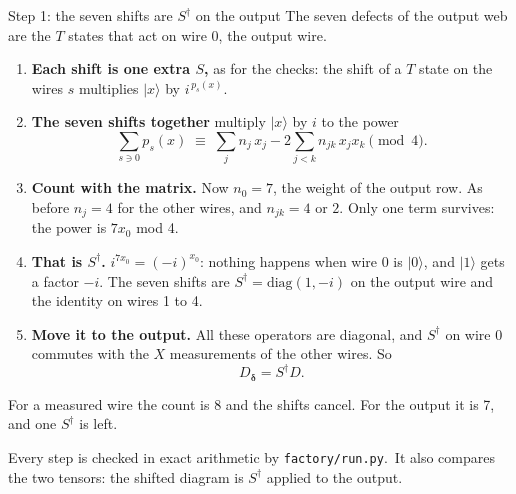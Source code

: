 \documentclass[aspectratio=169,10pt]{beamer}
\newcommand{\ket}[1]{\lvert#1\rangle}
\newcommand{\source}[1]{\par\vfill{\fontsize{6}{7}\selectfont\color{black!70}#1\par}}
\newcommand{\checkedref}{Every step is checked in exact arithmetic by \texttt{factory/run.py}.}
\begin{document}
\begin{frame}{Step 1: the seven shifts are $S^\dagger$ on the output}
\small
The seven defects of the output web are the $T$ states that act on wire 0, the output wire.
\begin{enumerate}
\item \textbf{Each shift is one extra $S$,} as for the checks: the shift of a $T$ state on the wires $s$ multiplies $\ket{x}$ by $i^{\,p_s(x)}$.
\item \textbf{The seven shifts together} multiply $\ket{x}$ by $i$ to the power
\[
 \textstyle\sum_{s\ni 0}p_s(x)\;\equiv\;\sum_j n_j\,x_j-2\sum_{j<k}n_{jk}\,x_jx_k \pmod 4 .
\]
\item \textbf{Count with the matrix.} Now $n_0=7$, the weight of the output row. As before $n_j=4$ for the other wires, and $n_{jk}=4$ or $2$. Only one term survives: the power is $7x_0$ mod 4.
\item \textbf{That is $S^\dagger$.} $i^{7x_0}=(-i)^{x_0}$: nothing happens when wire 0 is $\ket0$, and $\ket1$ gets a factor $-i$. The seven shifts are $S^\dagger=\mathrm{diag}(1,-i)$ on the output wire and the identity on wires 1 to 4.
\item \textbf{Move it to the output.} All these operators are diagonal, and $S^\dagger$ on wire 0 commutes with the $X$ measurements of the other wires. So
\[
 D_{\boldsymbol\delta}=S^\dagger D .
\]
\end{enumerate}
For a measured wire the count is 8 and the shifts cancel. For the output it is 7, and one $S^\dagger$ is left.
\source{\checkedref\ It also compares the two tensors: the shifted diagram is $S^\dagger$ applied to the output.}
\end{frame}
\end{document}
